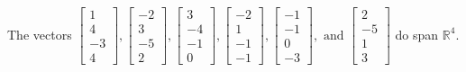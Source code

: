\begin{exercise}
\begin{exerciseStatement}
  \end{exerciseStatement}
  \begin{exerciseAnswer}
   The vectors \(\left[\begin{array}{r}
1 \\
4 \\
-3 \\
4
\end{array}\right] , \left[\begin{array}{r}
-2 \\
3 \\
-5 \\
2
\end{array}\right] , \left[\begin{array}{r}
3 \\
-4 \\
-1 \\
0
\end{array}\right] , \left[\begin{array}{r}
-2 \\
1 \\
-1 \\
-1
\end{array}\right] , \left[\begin{array}{r}
-1 \\
-1 \\
0 \\
-3
\end{array}\right] , \text{ and } \left[\begin{array}{r}
2 \\
-5 \\
1 \\
3
\end{array}\right]\) 
  	 do  
	span \(\mathbb{R}^4\).
  


  \end{exerciseAnswer}
\end{exercise}